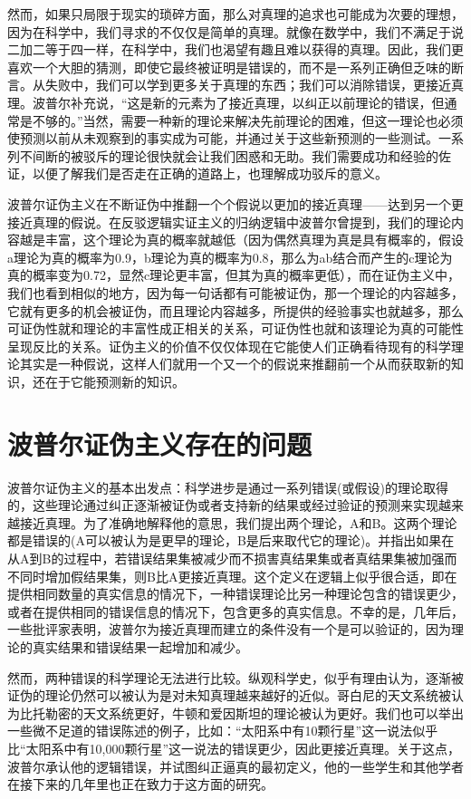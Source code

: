 \documentclass[]{article}
\begin{document}
\begin{multicols}{2}
然而，如果只局限于现实的琐碎方面，那么对真理的追求也可能成为次要的理想，因为在科学中，我们寻求的不仅仅是简单的真理。就像在数学中，我们不满足于说二加二等于四一样，在科学中，我们也渴望有趣且难以获得的真理。因此，我们更喜欢一个大胆的猜测，即使它最终被证明是错误的，而不是一系列正确但乏味的断言。从失败中，我们可以学到更多关于真理的东西；我们可以消除错误，更接近真理。波普尔补充说，“这是新的元素为了接近真理，以纠正以前理论的错误，但通常是不够的。”当然，需要一种新的理论来解决先前理论的困难，但这一理论也必须使预测以前从未观察到的事实成为可能，并通过关于这些新预测的一些测试。一系列不间断的被驳斥的理论很快就会让我们困惑和无助。我们需要成功和经验的佐证，以便了解我们是否走在正确的道路上，也理解成功驳斥的意义。

波普尔证伪主义在不断证伪中推翻一个个假说以更加的接近真理——达到另一个更接近真理的假说。在反驳逻辑实证主义的归纳逻辑中波普尔曾提到，我们的理论内容越是丰富，这个理论为真的概率就越低（因为偶然真理为真是具有概率的，假设a理论为真的概率为0.9，b理论为真的概率为0.8，那么为ab结合而产生的c理论为真的概率变为0.72，显然c理论更丰富，但其为真的概率更低），而在证伪主义中，我们也看到相似的地方，因为每一句话都有可能被证伪，那一个理论的内容越多，它就有更多的机会被证伪，而且理论内容越多，所提供的经验事实也就越多，那么可证伪性就和理论的丰富性成正相关的关系，可证伪性也就和该理论为真的可能性呈现反比的关系。证伪主义的价值不仅仅体现在它能使人们正确看待现有的科学理论其实是一种假说，这样人们就用一个又一个的假说来推翻前一个从而获取新的知识，还在于它能预测新的知识。


\section{波普尔证伪主义存在的问题}

波普尔证伪主义的基本出发点：科学进步是通过一系列错误(或假设)的理论取得的，这些理论通过纠正逐渐被证伪或者支持新的结果或经过验证的预测来实现越来越接近真理。为了准确地解释他的意思，我们提出两个理论，A和B。这两个理论都是错误的(A可以被认为是更早的理论，B是后来取代它的理论)。并指出如果在从A到B的过程中，若错误结果集被减少而不损害真结果集或者真结果集被加强而不同时增加假结果集，则B比A更接近真理。这个定义在逻辑上似乎很合适，即在提供相同数量的真实信息的情况下，一种错误理论比另一种理论包含的错误更少，或者在提供相同的错误信息的情况下，包含更多的真实信息。不幸的是，几年后，一些批评家\cite{1974On,2009Out}表明，波普尔为接近真理而建立的条件没有一个是可以验证的，因为理论的真实结果和错误结果一起增加和减少。

然而，两种错误的科学理论无法进行比较\cite{2014Falsifications}。纵观科学史，似乎有理由认为，逐渐被证伪的理论仍然可以被认为是对未知真理越来越好的近似。哥白尼的天文系统被认为比托勒密的天文系统更好，牛顿和爱因斯坦的理论被认为更好。我们也可以举出一些微不足道的错误陈述的例子，比如：“太阳系中有10颗行星”这一说法似乎比“太阳系中有10,000颗行星”这一说法的错误更少，因此更接近真理。关于这点，波普尔承认他的逻辑错误，并试图纠正逼真的最初定义，他的一些学生和其他学者在接下来的几年里也正在致力于这方面的研究。


\end{multicols}
\end{document}
